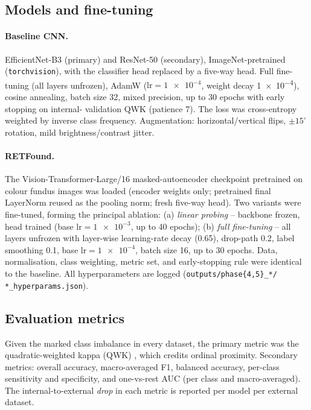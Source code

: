 \documentclass[11pt,a4paper]{article}
\begin{document}
\subsection{Models and fine-tuning}

\paragraph{Baseline CNN.} EfficientNet-B3 \citep{tan2019efficientnet} (primary)
and ResNet-50 \citep{he2016resnet} (secondary), ImageNet-pretrained
(\texttt{torchvision}), with the classifier head replaced by a five-way head. Full fine-tuning (all layers unfrozen), AdamW
($\text{lr}=\num{1e-4}$, weight decay \num{1e-4}), cosine annealing, batch
size 32, mixed precision, up to 30 epochs with early stopping on internal-
validation QWK (patience 7). The loss was cross-entropy weighted by inverse
class frequency. Augmentation: horizontal/vertical flips, $\pm15^\circ$
rotation, mild brightness/contrast jitter.

\paragraph{RETFound.} The Vision-Transformer-Large/16
\citep{dosovitskiy2021vit} masked-autoencoder \citep{he2022mae} checkpoint
pretrained on colour fundus images \citep{zhou2023retfound} was loaded (encoder
weights only; pretrained final LayerNorm reused as the pooling norm; fresh
five-way head). Two variants were fine-tuned, forming the principal ablation:
(a) \emph{linear probing} -- backbone frozen, head trained (base
$\text{lr}=\num{1e-3}$, up to 40 epochs); (b) \emph{full fine-tuning} -- all
layers unfrozen with layer-wise learning-rate decay (0.65), drop-path 0.2, label
smoothing 0.1, base $\text{lr}=\num{1e-4}$, batch size 16, up to 30 epochs.
Data, normalisation, class weighting, metric set, and early-stopping rule were
identical to the baseline. All hyperparameters are logged
(\texttt{outputs/phase\{4,5\}\_*/\,*\_hyperparams.json}).

\subsection{Evaluation metrics}

Given the marked class imbalance in every dataset, the primary metric was the
quadratic-weighted kappa (QWK) \citep{cohen1968kappa}, which credits ordinal
proximity. Secondary
metrics: overall accuracy, macro-averaged F1, balanced accuracy, per-class
sensitivity and specificity, and one-vs-rest AUC (per class and macro-averaged).
The internal-to-external \emph{drop} in each metric is reported per model per
external dataset.
\end{document}
